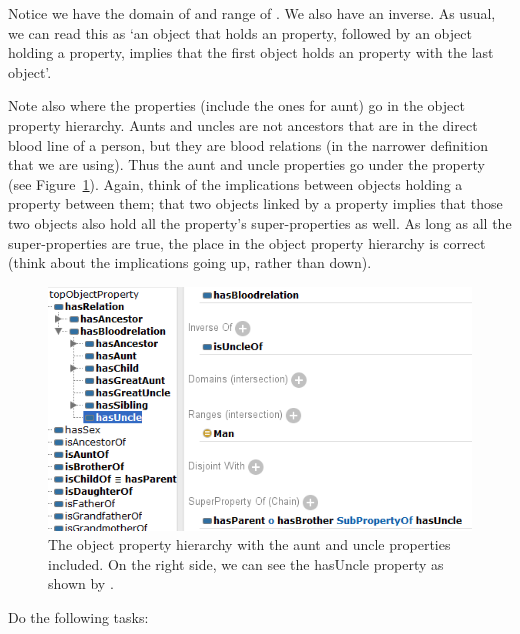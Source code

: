 {Notice we have the domain of \man and range of \person. We also have an inverse. As usual, we can read this as `an object that holds an  property, followed by an object holding a  property, implies that the first object holds an  property with the last object'.

Note also where the properties (include the ones for aunt) go in the object property hierarchy. Aunts and uncles are not ancestors that are in the direct blood line of a person, but they are blood relations (in the narrower definition that we are using). Thus the aunt and uncle properties go under the  property (see Figure~\ref{fig:uncleprops}). Again, think of the implications between objects holding a property between them; that two objects linked by a property implies that those two objects also hold all the property's super-properties as well. As long as all the super-properties are true, the place in the object property hierarchy is correct (think about the implications going up, rather than down).

\begin{figure}
\begin{center}
\includegraphics[width=\textwidth]{figures/new/prop_uncle.PNG}
\caption{The object property hierarchy with the aunt and uncle properties included. On the right side, we can see the hasUncle property as shown by \protege.}\label{fig:uncleprops}
\end{center}
\end{figure}
 
Do the following tasks:

}
